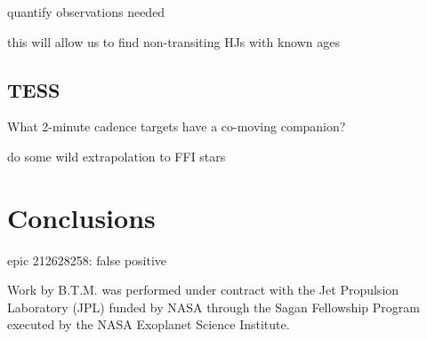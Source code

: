 \documentclass[twocolumn]{aastex62}
\begin{document}
quantify observations needed

this will allow us to find non-transiting HJs with known ages

\subsection{TESS}

What 2-minute cadence targets have a co-moving companion?

do some wild extrapolation to FFI stars%

\section{Conclusions}


epic 212628258: false positive

\acknowledgments


Work by B.T.M. was performed under contract with the Jet Propulsion
Laboratory (JPL) funded by NASA through the Sagan Fellowship Program executed
by the NASA Exoplanet Science Institute.


 
 

\end{document}
